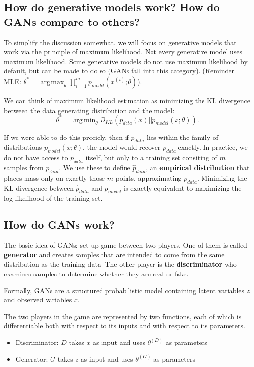 \documentclass{scrartcl}
\DeclareMathOperator*{\argmax}{arg\,max}
\DeclareMathOperator*{\argmin}{arg\,min}
\begin{document}
\subsection{How do generative models work? How do GANs compare to others?}
To simplify the discussion somewhat, we will focus on generative models that
work via the principle of maximum likelihood. Not every generative model
uses maximum likelihood. Some generative models do not use maximum likelihood by default, but can be made to do so (GANs fall into this category). (Reminder MLE: $\theta^* = \argmax_{\theta} \prod_{i=1}^m p_{model}(x^{(i)}; \theta)$).

We can think of maximum likelihood estimation as minimizing the KL divergence between the data generating distribution and the model: $$\theta^* = \argmin_{\theta} D_{KL}(p_{data}(x)||p_{model}(x;\theta)).$$

If we were able to do this preciely, then if $p_{data}$ lies within the family of distributions $p_{model}(x; \theta)$, the model would recover $p_{data}$ exactly. In practice, we do not have access to $p_{data}$ itself, but only to a training set consiting of $m$ samples from $p_{data}$. We use these to define $\hat{p}_{data}$, an \textbf{empirical distribution} that places mass only on exactly those $m$ points, approximating $p_{data}$. Minimizing the KL divergence between $\hat{p}_{data}$ and $p_{model}$ is exactly equivalent to maximizing the log-likelihood of the training set.

\subsection{How do GANs work?}
The basic idea of GANs: set up game between two players. One of them is called \textbf{generator} and creates samples that are intended to come from the same distribution as the training data. The other player is the \textbf{discriminator} who examines samples to determine whether they are real or fake.

Formally, GANs are a structured probabilistic model containing latent variables $z$ and observed variables $x$. 


The two players in the game are represented by two functions, each of which is differentiable both with respect to its inputs and with respect to its parameters.
\begin{itemize}
	\item
		Discriminator: $D$ takes $x$ as input and uses $\theta^{(D)}$ as parameters
	\item
		Generator: $G$ takes $z$ as input and uses $\theta^{(G)}$ as parameters
\end{itemize}
\end{document}
